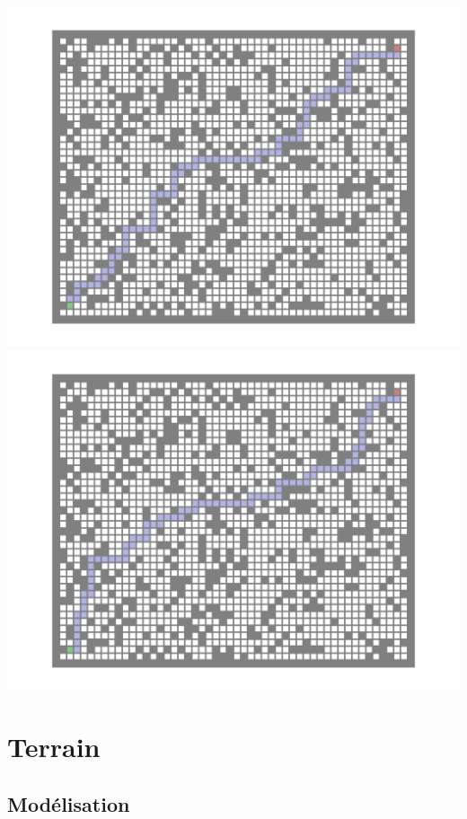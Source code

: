 \documentclass[11pt,class=report,crop=false]{standalone}
\begin{document}
\begin{center}
	\includegraphics[scale=\myscale,scale=0.5]{figures/labyrinthe-02-1}
	\includegraphics[scale=\myscale,scale=0.5]{figures/labyrinthe-02-2}
\end{center}


\section{Terrain}

\subsection{Modélisation}
\end{document}
